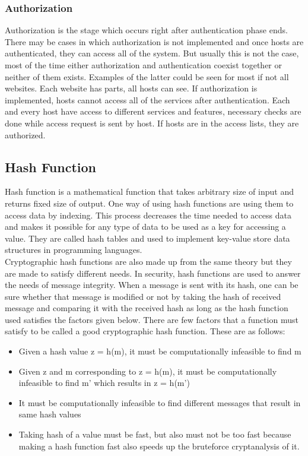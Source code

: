 \documentclass[a4paper, 12pt, titlepage]{article}
\begin{document}
\subsubsection{Authorization}
Authorization is the stage which occurs right after authentication phase ends\cite{identification}. There may be cases in which authorization is not implemented and once hosts are authenticated, they can access all of the system. But usually this is not the case, most of the time either authorization and authentication coexist together or neither of them exists\cite{authorization}. Examples of the latter could be seen for most if not all websites. Each website has parts, all hosts can see. If authorization is implemented, hosts cannot access all of the services after authentication. Each and every host have access to different services and features, necessary checks are done while access request is sent by host. If hosts are in the access lists, they are authorized.
\subsection{Hash Function}
Hash function is a mathematical function that takes arbitrary size of input and returns fixed size of output. One way of using hash functions are using them to access data by indexing. This process decreases the time needed to access data and makes it possible for any type of data to be used as a key for accessing a value. They are called hash tables and used to implement key-value store data structures in programming languages.
\bigskip
\\ Cryptographic hash functions are also made up from the same theory but they are made to satisfy different needs.  In security, hash functions are used to answer the needs of message integrity. When a message is sent with its hash, one can be sure whether that message is modified or not by taking the hash of received message and comparing it with the received hash as long as the hash function used satisfies the factors given below. There are few factors that a function must satisfy to be called a good cryptographic hash function. These are as follows\cite{hash}:
\begin{itemize}
\item Given a hash value z = h(m), it must be computationally infeasible to find m
\item Given z and m corresponding to z = h(m), it must be computationally infeasible to find m’ which results in z = h(m’)
\item It must be computationally infeasible to find different messages that result in same hash values
\item Taking hash of a value must be fast, but also must not be too fast because making a hash function fast also speeds up the bruteforce cryptanalysis of it.
\end{itemize}
\end{document}
